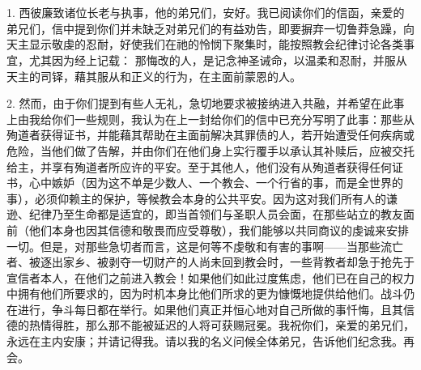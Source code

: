 \section{}

\par

\par

1. 西彼廉致诸位长老与执事，他的弟兄们，安好。我已阅读你们的信函，亲爱的弟兄们，信中提到你们并未缺乏对弟兄们的有益劝告，即要摒弃一切鲁莽急躁，向天主显示敬虔的忍耐，好使我们在祂的怜悯下聚集时，能按照教会纪律讨论各类事宜，尤其因为经上记载： 那悔改的人，是记念神圣诫命，以温柔和忍耐，并服从天主的司铎，藉其服从和正义的行为，在主面前蒙恩的人。\par

2. 然而，由于你们提到有些人无礼，急切地要求被接纳进入共融，并希望在此事上由我给你们一些规则，我认为在上一封给你们的信中已充分写明了此事：那些从殉道者获得证书，并能藉其帮助在主面前解决其罪债的人，若开始遭受任何疾病或危险，当他们做了告解，并由你们在他们身上实行覆手以承认其补赎后，应被交托给主，并享有殉道者所应许的平安。至于其他人，他们没有从殉道者获得任何证书，心中嫉妒（因为这不单是少数人、一个教会、一个行省的事，而是全世界的事），必须仰赖主的保护，等候教会本身的公共平安。因为这对我们所有人的谦逊、纪律乃至生命都是适宜的，即当首领们与圣职人员会面，在那些站立的教友面前（他们本身也因其信德和敬畏而应受尊敬），我们能够以共同商议的虔诚来安排一切。但是，对那些急切者而言，这是何等不虔敬和有害的事啊——当那些流亡者、被逐出家乡、被剥夺一切财产的人尚未回到教会时，一些背教者却急于抢先于宣信者本人，在他们之前进入教会！如果他们如此过度焦虑，他们已在自己的权力中拥有他们所要求的，因为时机本身比他们所求的更为慷慨地提供给他们。战斗仍在进行，争斗每日都在举行。如果他们真正并恒心地对自己所做的事忏悔，且其信德的热情得胜，那么那不能被延迟的人将可获赐冠冕。我祝你们，亲爱的弟兄们，永远在主内安康；并请记得我。请以我的名义问候全体弟兄，告诉他们纪念我。再会。\par


